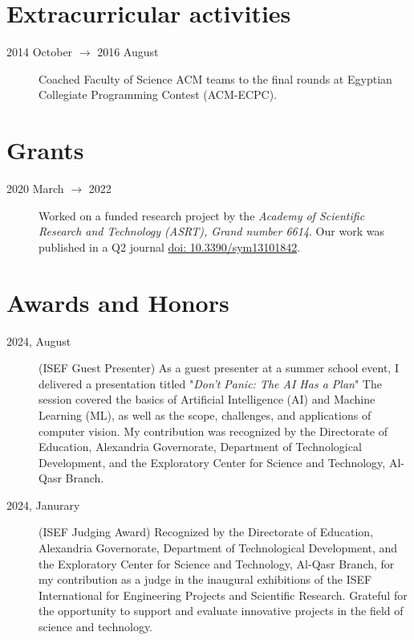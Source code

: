 \documentclass[margin,line]{resume}
\newcommand*{\doi}[1]{\href{http://dx.doi.org/#1}{doi: #1}}
\begin{document}
\begin{resume}
	\section{\mysidestyle Extracurricular activities}\vspace{1mm}
	\begin{description}
		\item[2014 October $\rightarrow$ 2016 August] Coached Faculty of Science ACM teams to the final rounds at Egyptian Collegiate Programming Contest (ACM-ECPC).

	\end{description}

	\section{\mysidestyle Grants}
	\begin{description}
		\item[2020 March $\rightarrow$ 2022] Worked on a funded research project by the \textit{Academy of Scientific Research and Technology (ASRT), Grand number 6614}. Our work was published in a Q2 journal \doi{10.3390/sym13101842}.
	\end{description}

	\section{\mysidestyle Awards and Honors}
	\begin{description}
		\item [2024, August] (ISEF Guest Presenter) As a guest presenter at a summer school event, I delivered a presentation titled "\textit{Don't Panic: The AI Has a Plan}" The session covered the basics of Artificial Intelligence (AI) and Machine Learning (ML), as well as the scope, challenges, and applications of computer vision. My contribution was recognized by the Directorate of Education, Alexandria Governorate, Department of Technological Development, and the Exploratory Center for Science and Technology, Al-Qasr Branch.
		\item[2024, Janurary] (ISEF Judging Award) Recognized by the Directorate of Education, Alexandria Governorate, Department of Technological Development, and the Exploratory Center for Science and Technology, Al-Qasr Branch, for my contribution as a judge in the inaugural exhibitions of the ISEF International for Engineering Projects and Scientific Research. Grateful for the opportunity to support and evaluate innovative projects in the field of science and technology.
	\end{description}



\end{resume}
\end{document}
